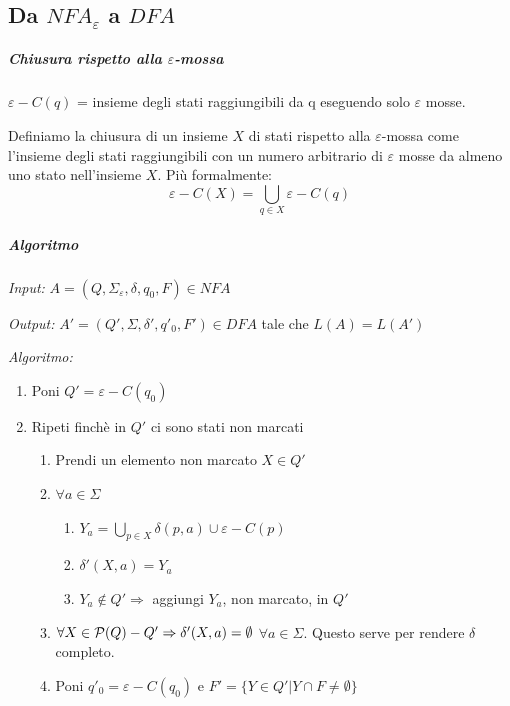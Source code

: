 \subsection{Da $NFA_{\varepsilon}$ a $DFA$}
\subparagraph{Chiusura rispetto alla $\varepsilon$-mossa}

$\varepsilon - C(q)$ = insieme degli stati raggiungibili da q eseguendo solo $\varepsilon$ mosse.

Definiamo la chiusura di un insieme $X$ di stati rispetto alla $\varepsilon$-mossa come l'insieme degli stati raggiungibili con un numero arbitrario di $\varepsilon$ mosse da almeno uno stato nell'insieme $X$. Pi\`u formalmente:
\[
	\varepsilon-C(X) = \bigcup_{q \in X} \varepsilon-C(q)
\]

\subparagraph{Algoritmo}
\begin{description}
	\item \emph{Input:} $A = (Q, \Sigma_{\varepsilon}, \delta, q_0, F) \in NFA$
	\item \emph{Output:} $A' = (Q', \Sigma, \delta', q'_0, F') \in DFA$ tale che $L(A) = L(A')$
	\item \emph{Algoritmo:}
		\begin{enumerate}[label*=\arabic*.]
			\item Poni $Q' = \varepsilon-C(q_0)$
			\item Ripeti finch\`e in $Q'$ ci sono stati non marcati
				\begin{enumerate}[label*=\arabic*.]
					\item Prendi un elemento non marcato $X \in Q'$
					\item $\forall a \in \Sigma$
						\begin{enumerate}[label*=\arabic*.]
							\item $Y_a = \bigcup_{p \in X} \delta(p,a) \cup \varepsilon - C(p)$
							\item $\delta'(X,a) = Y_a$
							\item $Y_a \notin Q' \Rightarrow$ aggiungi $Y_a$, non marcato, in $Q'$  						
						\end{enumerate}
			\item $\forall X \in {\cal P}(Q) - Q' \Rightarrow \delta'(X, a) = \emptyset$ $ \forall a \in \Sigma$. Questo serve per rendere $\delta$ completo.
			\item Poni $q'_0 = \varepsilon - C(q_0)$ e $F' = \{Y \in Q' | Y \cap F \neq \emptyset\}$
				\end{enumerate}
		\end{enumerate}
\end{description}
